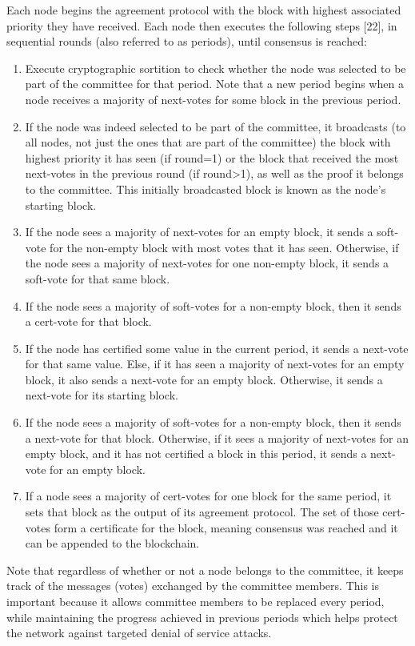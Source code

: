 Each node begins the agreement protocol with the block with highest associated priority they have received. Each node then executes the following steps [22], in sequential rounds (also referred to as periods), until consensus is reached:

\begin{enumerate}
  \item Execute cryptographic sortition to check whether the node was selected to be part of the committee for that period. Note that a new period begins when a node receives a majority of next-votes for some block in the previous period.
  \item If the node was indeed selected to be part of the committee, it broadcasts (to all nodes, not just the ones that are part of the committee) the block with highest priority it has seen (if round=1) or the block that received the most next-votes in the previous round (if round>1), as well as the proof it belongs to the committee. This initially broadcasted block is known as the node’s starting block.
  \item If the node sees a majority of next-votes for an empty block, it sends a soft-vote for the non-empty block with most votes that it has seen. Otherwise, if the node sees a majority of next-votes for one non-empty block, it sends a soft-vote for that same block.
  \item If the node sees a majority of soft-votes for a non-empty block, then it sends a cert-vote for that block.
  \item If the node has certified some value in the current period, it sends a next-vote for that same value. Else, if it has seen a majority of next-votes for an empty block, it also sends a next-vote for an empty block. Otherwise, it sends a next-vote for its starting block.
  \item If the node sees a majority of soft-votes for a non-empty block, then it sends a next-vote for that block. Otherwise, if it sees a majority of next-votes for an empty block, and it has not certified a block in this period, it sends a next-vote for an empty block.
  \item If a node sees a majority of cert-votes for one block for the same period, it sets that block as the output of its agreement protocol. The set of those cert-votes form a certificate for the block, meaning consensus was reached and it can be appended to the blockchain.
\end{enumerate}

Note that regardless of whether or not a node belongs to the committee, it keeps track of the messages (votes) exchanged by the committee members. This is important because it allows committee members to be replaced every period, while maintaining the progress achieved in previous periods which helps protect the network against targeted denial of service attacks.


